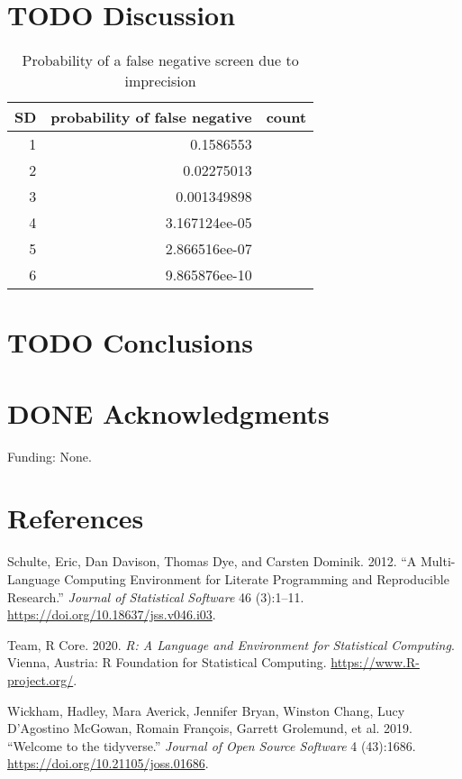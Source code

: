 \documentclass[review]{elsarticle}
\begin{document}
\clearpage

\section*{{\bfseries\sffamily TODO} Discussion}
\label{sec:orgc454393}

\begin{table}[htbp]
\caption[sigma]{\label{tab:org02d2003}Probability of a false negative screen due to imprecision}
\centering
\begin{tabular}{rrl}
SD & probability of false negative & count\\
\hline
1 & 0.1586553\\
2 & 0.02275013\\
3 & 0.001349898\\
4 & 3.167124ee-05\\
5 & 2.866516ee-07\\
6 & 9.865876ee-10\\
\end{tabular}
\end{table}

\section*{{\bfseries\sffamily TODO} Conclusions}
\label{sec:org7bb9d72}

\section*{{\bfseries\sffamily DONE} Acknowledgments}
\label{sec:org04b8520}
Funding: None.
\section*{References}
\label{sec:org4c9f7b9}
\begin{hangparas}{1.5em}{1}
\hypertarget{citeproc_bib_item_1}{Schulte, Eric, Dan Davison, Thomas Dye, and Carsten Dominik. 2012. “A Multi-Language Computing Environment for Literate Programming and Reproducible Research.” \textit{Journal of Statistical Software} 46 (3):1–11. \href{https://doi.org/10.18637/jss.v046.i03}{https://doi.org/10.18637/jss.v046.i03}.}

\hypertarget{citeproc_bib_item_2}{Team, R Core. 2020. \textit{R: A Language and Environment for Statistical Computing}. Vienna, Austria: R Foundation for Statistical Computing. \href{https://www.R-project.org/}{https://www.R-project.org/}.}

\hypertarget{citeproc_bib_item_3}{Wickham, Hadley, Mara Averick, Jennifer Bryan, Winston Chang, Lucy D’Agostino McGowan, Romain François, Garrett Grolemund, et al. 2019. “Welcome to the tidyverse.” \textit{Journal of Open Source Software} 4 (43):1686. \href{https://doi.org/10.21105/joss.01686}{https://doi.org/10.21105/joss.01686}.}
\end{hangparas}
\end{document}
